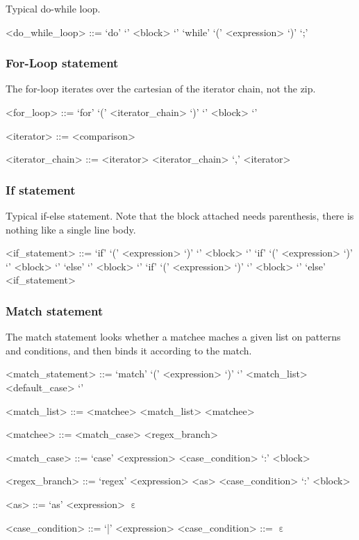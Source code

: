 Typical do-while loop.

\begin{grammar}
<do_while_loop> ::= `do' `{' <block> `}' `while' `(' <expression> `)' `;'
\end{grammar}

%
\subsubsection{For-Loop statement}

The for-loop iterates over the cartesian of the iterator chain, not the zip.

\begin{grammar}
<for_loop> ::= `for' `(' <iterator_chain> `)' `{' <block> `}'

<iterator> ::= <comparison>

<iterator_chain> ::= <iterator>
\alt <iterator_chain> `,' <iterator>
\end{grammar}

%
\subsubsection{If statement}

Typical if-else statement. Note that the block attached needs parenthesis, there is nothing like a single line body.

\begin{grammar}
<if_statement> ::= `if' `(' <expression> `)' `{' <block> `}'
\alt `if' `(' <expression> `)' `{' <block> `}' `else' `{' <block> `}'
\alt `if' `(' <expression> `)' `{' <block> `}' `else' <if_statement>
\end{grammar}

%
\subsubsection{Match statement}

The match statement looks whether a matchee maches a given list on patterns and conditions, and then binds it according to the match.

\begin{grammar}
<match_statement> ::= `match' `(' <expression> `)' `{' <match_list> <default_case> `}'

<match_list> ::= <matchee>
\alt <match_list> <matchee>

<matchee> ::= <match_case>
\alt <regex_branch>

<match_case> ::= `case' <expression> <case_condition> `:' <block>

<regex_branch> ::= `regex' <expression> <as> <case_condition> `:' <block>

<as> ::= `as' <expression>
\alt $\upepsilon$

<case_condition> ::= `|' <expression>
<case_condition> ::= $\upepsilon$
\end{grammar}

